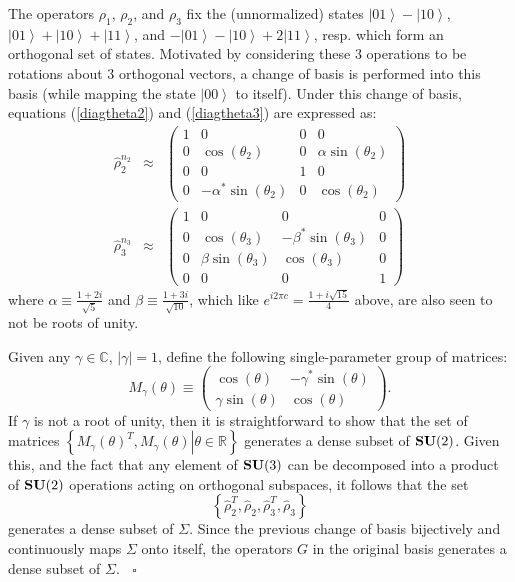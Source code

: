 \documentclass[twocolumn,11pt]{article}
\begin{document}
The operators $\rho_1$, $\rho_2$, and $\rho_3$ fix the (unnormalized) states
$\left|01\right>-\left|10\right>$, 
$\left|01\right>+\left|10\right>+\left|11\right>$, and
$-\left|01\right>-\left|10\right>+2\left|11\right>$, resp. which form an
orthogonal set of states.  Motivated by considering these 3 operations to
be rotations about 3 orthogonal vectors, a change of basis is performed
into this basis (while mapping the state $\left|00\right>$ to itself).
Under this change of basis, equations (\ref{diagtheta2}) and (\ref{diagtheta3})
are expressed as:
\begin{eqnarray*}
\hat\rho_2^{n_2} &\approx& \left(\begin{array}{cccc}
   1 &  0                      & 0 & 0 \\
   0 &  \cos(\theta_2)         & 0 & \alpha\sin(\theta_2) \\
   0 &  0                      & 1 & 0                       \\
   0 & -\alpha^*\sin(\theta_2) & 0 & \cos(\theta_2)
   \end{array}\right) \\
\hat\rho_3^{n_3} &\approx& \left(\begin{array}{cccc}
   1 & 0                   &  0                     & 0 \\
   0 & \cos(\theta_3)      & -\beta^*\sin(\theta_3) & 0 \\
   0 & \beta\sin(\theta_3) &  \cos(\theta_3)        & 0 \\
   0 & 0                   &  0                     & 1
   \end{array}\right)
\end{eqnarray*}
where $\alpha\equiv\frac{1+2i}{\sqrt5}$ and
$\beta\equiv\frac{1+3i}{\sqrt{10}}$, which like $e^{i2\pi
c}=\frac{1+i\sqrt{15}}{4}$ above, are also seen to not be roots of
unity.

Given any $\gamma\in\mathbb C$, $|\gamma|=1$, define the following
single-parameter group of matrices:
\[ M_\gamma(\theta) \equiv
\left(\begin{array}{rr} \cos(\theta) & -\gamma^*\sin(\theta) \\
\gamma\sin(\theta) & \cos(\theta) \end{array}\right). \]
If $\gamma$ is not a root of unity, then it is straightforward to
show that the set of matrices $\left\{\left.M_\gamma(\theta)^T,
M_\gamma(\theta)\right|\theta\in\mathbb R\right\}$ generates a dense
subset of $\mbox{\bf SU}(2)$.  Given this, and the fact that any element of
$\mbox{\bf SU}(3)$ can be decomposed into a product of $\mbox{\bf SU}(2)$
operations acting
on orthogonal subspaces\cite{tuarg}, it follows that the set
\[ \left\{\hat\rho_2^T,\hat\rho_2,\hat\rho_3^T,\hat\rho_3\right\} \]
generates a dense subset of $\Sigma$.  Since the previous change of
basis bijectively and continuously maps $\Sigma$ onto itself, the
operators $G$ in the original basis generates a dense subset of
$\Sigma$. $\;\;\square$
\end{document}
